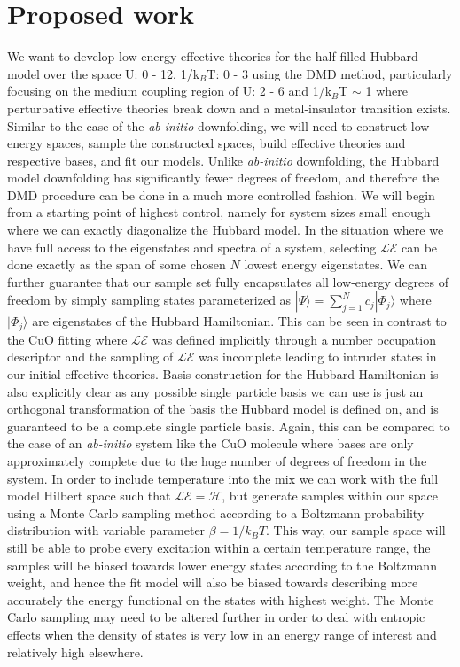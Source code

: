 \documentclass{article}
\begin{document}
\section{Proposed work}
We want to develop low-energy effective theories for the
half-filled Hubbard model over the space U: 0 - 12, 1/k$_B$T: 0 - 3 using the DMD method, particularly focusing on the medium coupling region of U: 2 - 6 and 1/k$_B$T $\sim$ 1 where perturbative effective theories break down and a metal-insulator transition exists.
Similar to the case of the \textit{ab-initio} downfolding, we will need to construct low-energy spaces, sample the constructed spaces, build effective theories and respective bases, and fit our models.
Unlike \textit{ab-initio} downfolding, the Hubbard model downfolding has significantly fewer degrees of freedom, and therefore the DMD procedure can be done in a much more controlled fashion.
We will begin from a starting point of highest control, namely for system sizes small enough where we can exactly diagonalize the Hubbard model.
In the situation where we have full access to the eigenstates and spectra of a system, selecting $\mathcal{LE}$ can be done exactly as the span of some chosen $N$ lowest energy eigenstates. 
We can further guarantee that our sample set fully encapsulates all low-energy degrees of freedom by simply sampling states parameterized as $|\Psi\rangle = \sum_{j=1}^N c_j |\Phi_j\rangle$ where $|\Phi_j\rangle$ are eigenstates of the Hubbard Hamiltonian.
This can be seen in contrast to the CuO fitting where $\mathcal{LE}$ was defined implicitly through a number occupation descriptor and the sampling of $\mathcal{LE}$ was incomplete leading to intruder states in our initial effective theories.
Basis construction for the Hubbard Hamiltonian is also explicitly clear as any possible single particle basis we can use is just an orthogonal transformation of the basis the Hubbard model is defined on, and is guaranteed to be a complete single particle basis.
Again, this can be compared to the case of an \textit{ab-initio} system like the CuO molecule where bases are only approximately complete due to the huge number of degrees of freedom in the system.
In order to include temperature into the mix we can work with the full model Hilbert space such that $\mathcal{LE} = \mathcal{H}$, but generate samples within our space using a Monte Carlo sampling method according to a Boltzmann probability distribution with variable parameter $\beta = 1/k_BT$.
This way, our sample space will still be able to probe every excitation within a certain temperature range, the samples will be biased towards lower energy states according to the Boltzmann weight, and hence the fit model will also be biased towards describing more accurately the energy functional on the states with highest weight.
The Monte Carlo sampling may need to be altered further in order to deal with entropic effects when the density of states is very low in an energy range of interest and relatively high elsewhere.
\end{document}
